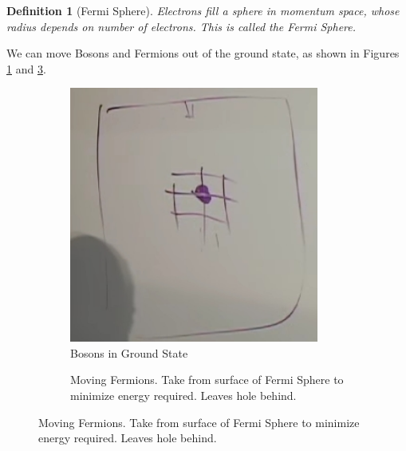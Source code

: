 \documentclass[]{article}
\newtheorem{defn}[thm]{Definition}
\begin{document}
\begin{defn}[Fermi Sphere]
	Electrons fill a sphere in momentum space, whose radius depends on number of electrons. This is called the Fermi Sphere.
\end{defn}

We can move Bosons and Fermions out of the ground state, as shown in Figures \ref{fig:bosons:move:ground:state} and \ref{fig:fermions:move:ground:state}.
\begin{figure}[H]
	\caption{Moving Bosons and Fermions from lowest state}
	\begin{subfigure}{0.5\textwidth}
		\caption{Bosons in Ground State}\label{fig:bosons:move:ground:state}
		\includegraphics[width=0.9\textwidth]{bosons-ground-state}
	\end{subfigure}
	\begin{subfigure}{0.5\textwidth}
		\caption{Moving Fermions. Take from surface of Fermi Sphere to minimize energy required. Leaves hole behind.}\label{fig:fermions:move:ground:state}

\end{subfigure}
\end{figure}
\end{document}
